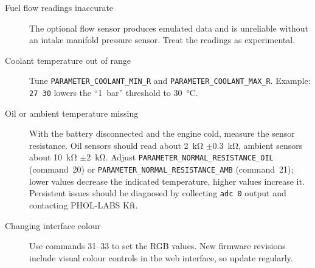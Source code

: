 \begin{description}
    \item[Fuel flow readings inaccurate] The optional flow sensor produces emulated data and is unreliable without an intake manifold pressure sensor. Treat the readings as experimental.
    \item[Coolant temperature out of range] Tune \texttt{PARAMETER\_COOLANT\_MIN\_R} and \texttt{PARAMETER\_COOLANT\_MAX\_R}. Example: \verb|27 30| lowers the ``1~bar'' threshold to \SI{30}{\celsius}.
    \item[Oil or ambient temperature missing] With the battery disconnected and the engine cold, measure the sensor resistance. Oil sensors should read about \SI{2}{\kilo\ohm} \ensuremath{\pm}\SI{0.3}{\kilo\ohm}, ambient sensors about \SI{10}{\kilo\ohm} \ensuremath{\pm}\SI{2}{\kilo\ohm}. Adjust \texttt{PARAMETER\_NORMAL\_RESISTANCE\_OIL} (command~20) or \texttt{PARAMETER\_NORMAL\_RESISTANCE\_AMB} (command~21); lower values decrease the indicated temperature, higher values increase it. Persistent issues should be diagnosed by collecting \verb|adc 0| output and contacting PHOL-LABS Kft.
    \item[Changing interface colour] Use commands 31--33 to set the RGB values. New firmware revisions include visual colour controls in the web interface, so update regularly.
\end{description}
